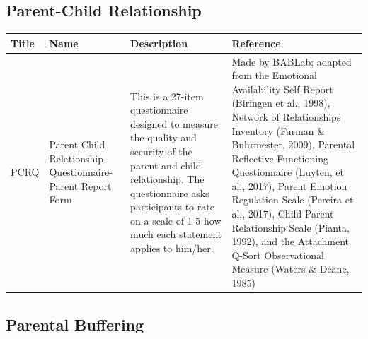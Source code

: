 \documentclass[]{book}
\begin{document}
\hypertarget{parent-child-relationship-1}{%
\subsection{Parent-Child Relationship}\label{parent-child-relationship-1}}

\begin{longtable}[]{@{}llll@{}}
\toprule
\begin{minipage}[b]{0.14\columnwidth}\raggedright
Title\strut
\end{minipage} & \begin{minipage}[b]{0.18\columnwidth}\raggedright
Name\strut
\end{minipage} & \begin{minipage}[b]{0.24\columnwidth}\raggedright
Description\strut
\end{minipage} & \begin{minipage}[b]{0.33\columnwidth}\raggedright
Reference\strut
\end{minipage}\tabularnewline
\midrule
\endhead
\begin{minipage}[t]{0.14\columnwidth}\raggedright
PCRQ\strut
\end{minipage} & \begin{minipage}[t]{0.18\columnwidth}\raggedright
Parent Child Relationship Questionnaire- Parent Report Form\strut
\end{minipage} & \begin{minipage}[t]{0.24\columnwidth}\raggedright
This is a 27-item questionnaire designed to measure the quality and security of the parent and child relationship. The questionnaire asks participants to rate on a scale of 1-5 how much each statement applies to him/her.\strut
\end{minipage} & \begin{minipage}[t]{0.33\columnwidth}\raggedright
Made by BABLab; adapted from the Emotional Availability Self Report (Biringen et al., 1998), Network of Relationships Inventory (Furman \& Buhrmester, 2009), Parental Reflective Functioning Questionnaire (Luyten, et al., 2017), Parent Emotion Regulation Scale (Pereira et al., 2017), Child Parent Relationship Scale (Pianta, 1992), and the Attachment Q-Sort Observational Measure (Waters \& Deane, 1985)\strut
\end{minipage}\tabularnewline
\bottomrule
\end{longtable}

\hypertarget{parental-buffering-1}{%
\subsection{Parental Buffering}\label{parental-buffering-1}}
\end{document}
